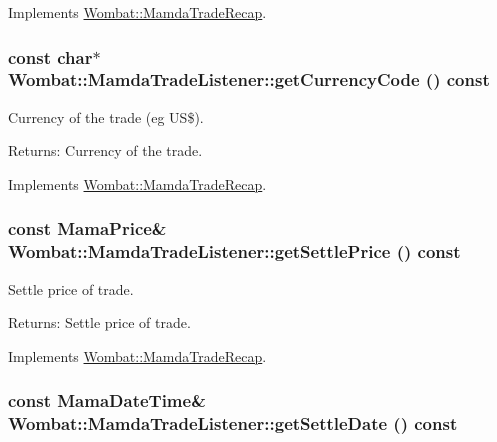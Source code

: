 Implements \hyperlink{classWombat_1_1MamdaTradeRecap_8474365e849b98332d5d9762347e5aae}{Wombat::Mamda\-Trade\-Recap}.\hypertarget{classWombat_1_1MamdaTradeListener_cbbf27265245059efc55efa1d6db2c0b}{
\subsubsection[getCurrencyCode]{\setlength{\rightskip}{0pt plus 5cm}const char$\ast$ Wombat::Mamda\-Trade\-Listener::get\-Currency\-Code () const}}
\label{classWombat_1_1MamdaTradeListener_cbbf27265245059efc55efa1d6db2c0b}


Currency of the trade (eg US\$). 

\begin{Desc}
\item[Returns:]Currency of the trade. \end{Desc}


Implements \hyperlink{classWombat_1_1MamdaTradeRecap_6587bdc84af742abd6cbb742737cc6db}{Wombat::Mamda\-Trade\-Recap}.\hypertarget{classWombat_1_1MamdaTradeListener_f3eda46328eb6e9a02e76ff6f936ecc5}{
\subsubsection[getSettlePrice]{\setlength{\rightskip}{0pt plus 5cm}const Mama\-Price\& Wombat::Mamda\-Trade\-Listener::get\-Settle\-Price () const}}
\label{classWombat_1_1MamdaTradeListener_f3eda46328eb6e9a02e76ff6f936ecc5}


Settle price of trade. 

\begin{Desc}
\item[Returns:]Settle price of trade. \end{Desc}


Implements \hyperlink{classWombat_1_1MamdaTradeRecap_859bb4a768932a59460651ade04e4b81}{Wombat::Mamda\-Trade\-Recap}.\hypertarget{classWombat_1_1MamdaTradeListener_2f94098f4eefc746ec8447cf31a190a7}{
\subsubsection[getSettleDate]{\setlength{\rightskip}{0pt plus 5cm}const Mama\-Date\-Time\& Wombat::Mamda\-Trade\-Listener::get\-Settle\-Date () const}}
\label{classWombat_1_1MamdaTradeListener_2f94098f4eefc746ec8447cf31a190a7}


